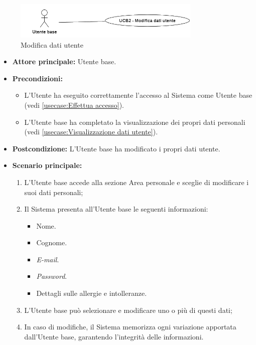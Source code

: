 \newpage
{}
\label{usecase:Modifica dati utente}

\begin{figure}[h]
	\centering
	\includegraphics[width=0.8\textwidth]{./uml/UCB2.png} 
	\caption{Modifica dati utente}
	\label{fig:UCB2}
  \end{figure}

\begin{itemize}
	\item \textbf{Attore principale:} Utente base.

	\item \textbf{Precondizioni:}
	      \begin{itemize}
		      \item L'Utente ha eseguito correttamente l'accesso al Sistema come Utente base (vedi \autoref{usecase:Effettua accesso}).
		      \item L'Utente base ha completato la visualizzazione dei propri
		            dati personali (vedi \autoref{usecase:Visualizzazione dati utente}).
	      \end{itemize}

	\item \textbf{Postcondizione:} L'Utente base ha modificato i propri dati utente.

	\item \textbf{Scenario principale:}
	      \begin{enumerate}
		      \item L'Utente base accede alla sezione Area personale e sceglie di modificare i suoi dati personali;
		      \item Il Sistema presenta all'Utente base le seguenti informazioni:
		            \begin{itemize}
			            \item Nome.
			            \item Cognome.
			            \item \textit{E-mail}.
			            \item \textit{Password}.
			            \item Dettagli sulle allergie e intolleranze.
		            \end{itemize}
		      \item L'Utente base può selezionare e modificare uno o più di questi dati;
		      \item In caso di modifiche, il Sistema memorizza ogni variazione apportata dall'Utente base, garantendo l'integrità delle informazioni.
	      \end{enumerate}
\end{itemize}
